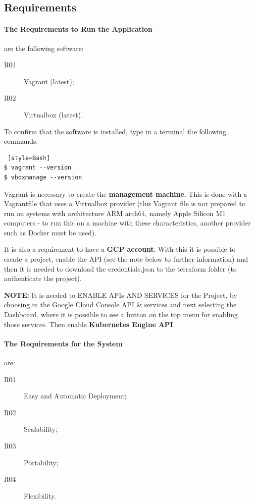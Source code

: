 \documentclass[12pt,a4paper,oneside]{report}
\begin{document}
\subsection{Requirements}
\label{section:requirements}
\paragraph{The Requirements to Run the Application} are the following software:
\begin{description}
\item[R01] Vagrant (latest);
\item[R02] Virtualbox (latest).
\end{description}

To confirm that the software is installed, type in a terminal the following commands:
\begin{lstlisting} [style=Bash]
$ vagrant --version
$ vboxmanage --version
\end{lstlisting}

Vagrant is necessary to create the \textbf{management machine}. This is done with a Vagrantfile that uses a Virtualbox provider (this Vagrant file is not prepared to run on systems with architecture ARM arch64, namely Apple Silicon M1 computers - to run this on a machine with these characteristics, another provider such as Docker must be used).

It is also a requirement to have a \textbf{\ac{GCP} account}. With this it is possible to create a project, enable the API (see the note below to further information) and then it is needed to download the credentials.json to the terraform folder (to authenticate the project).

\textbf{NOTE:} It is needed to ENABLE APIs AND SERVICES for the Project, by choosing in the Google Cloud Console API & services and next selecting the Dashboard, where it is possible to see a button on the top menu for enabling those services. Then enable \textbf{Kubernetes Engine API}.

\paragraph{The Requirements for the System} are:
\begin{description}
\item[R01] \label{itm:r01} Easy and Automatic Deployment;
\item[R02] \label{itm:r02} Scalability;
\item[R03] \label{itm:r03} Portability;
\item[R04] \label{itm:r04} Flexibility.
\end{description}
\end{document}

